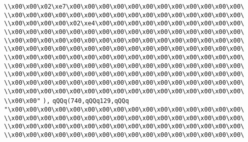 \verb|\\x00\x00\x02\xe7\x00\x00\x00\x00\x00\x00\x00\x00\x00\x00\x00\x00\|\newline
\verb|\\x00\x00\x00\x00\x00\x00\x00\x00\x00\x00\x00\x00\x00\x00\x00\x00\|\newline
\verb|\\x00\x00\x00\x00\x02\xe4\x00\x00\x00\x00\x00\x00\x00\x00\x00\x00\|\newline
\verb|\\x00\x00\x00\x00\x00\x00\x00\x00\x00\x00\x00\x00\x00\x00\x00\x00\|\newline
\verb|\\x00\x00\x00\x00\x00\x00\x00\x00\x00\x00\x00\x00\x00\x00\x00\x00\|\newline
\verb|\\x00\x00\x00\x00\x00\x00\x00\x00\x00\x00\x00\x00\x00\x00\x00\x00\|\newline
\verb|\\x00\x00\x00\x00\x00\x00\x00\x00\x00\x00\x00\x00\x00\x00\x00\x00\|\newline
\verb|\\x00\x00\x00\x00\x00\x00\x00\x00\x00\x00\x00\x00\x00\x00\x00\x00\|\newline
\verb|\\x00\x00\x00\x00\x00\x00\x00\x00\x00\x00\x00\x00\x00\x00\x00\x00\|\newline
\verb|\\x00\x00\x00\x00\x00\x00\x00\x00\x00\x00\x00\x00\x00\x00\x00\x00\|\newline
\verb|\\x00\x00\x00\x00\x00\x00\x00\x00\x00\x00\x00\x00\x00\x00\x00\x00\|\newline
\verb|\\x00\x00"|\newline
\verb|),|\newline
\verb|qQQq(740,qQQq129,qQQq|\newline
\verb|"\x00\x00\x00\x00\x00\x00\x00\x00\x00\x00\x00\x00\x00\x00\x00\x00\|\newline
\verb|\\x00\x00\x00\x00\x00\x00\x00\x00\x00\x00\x00\x00\x00\x00\x00\x00\|\newline
\verb|\\x00\x00\x00\x00\x00\x00\x00\x00\x00\x00\x00\x00\x00\x00\x00\x00\|\newline
\verb|\\x00\x00\x00\x00\x00\x00\x00\x00\x00\x00\x00\x00\x00\x00\x00\x00\|\newline

